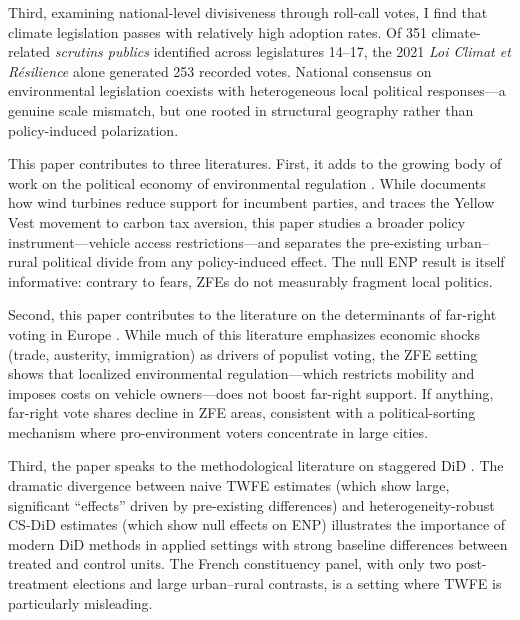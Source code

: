\documentclass[12pt]{article}
\begin{document}
Third, examining national-level divisiveness through roll-call votes, I find that climate legislation passes with relatively high adoption rates. Of 351 climate-related \textit{scrutins publics} identified across legislatures 14--17, the 2021 \textit{Loi Climat et R\'esilience} alone generated 253 recorded votes. National consensus on environmental legislation coexists with heterogeneous local political responses---a genuine scale mismatch, but one rooted in structural geography rather than policy-induced polarization.

This paper contributes to three literatures. First, it adds to the growing body of work on the political economy of environmental regulation \citep{Dragu2022, aklin2020, martinez2022does, aghion2023environmental}. While \citet{martinez2022does} documents how wind turbines reduce support for incumbent parties, and \citet{douenne2022yellow} traces the Yellow Vest movement to carbon tax aversion, this paper studies a broader policy instrument---vehicle access restrictions---and separates the pre-existing urban--rural political divide from any policy-induced effect. The null ENP result is itself informative: contrary to fears, ZFEs do not measurably fragment local politics.

Second, this paper contributes to the literature on the determinants of far-right voting in Europe \citep{autor2020importing, colantone2018trade, dustmann2019immigration, bergeaud2024political, rodrik2021why, enke2020moral}. While much of this literature emphasizes economic shocks (trade, austerity, immigration) as drivers of populist voting, the ZFE setting shows that localized environmental regulation---which restricts mobility and imposes costs on vehicle owners---does not boost far-right support. If anything, far-right vote shares decline in ZFE areas, consistent with a political-sorting mechanism where pro-environment voters concentrate in large cities.

Third, the paper speaks to the methodological literature on staggered DiD \citep{goodman2021difference, sun2021estimating, roth2023whats}. The dramatic divergence between naive TWFE estimates (which show large, significant ``effects'' driven by pre-existing differences) and heterogeneity-robust CS-DiD estimates (which show null effects on ENP) illustrates the importance of modern DiD methods in applied settings with strong baseline differences between treated and control units. The French constituency panel, with only two post-treatment elections and large urban--rural contrasts, is a setting where TWFE is particularly misleading.
\end{document}
